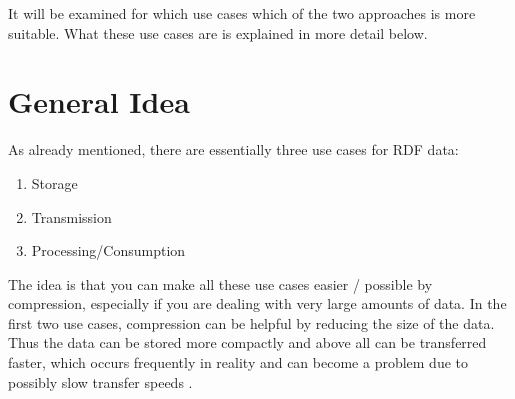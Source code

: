 It will be examined for which use cases which of the two approaches is more suitable. What these use cases are is explained in more detail below.



\section{General Idea}

%
%
%

As already mentioned, there are essentially three use cases for RDF data:

\begin{enumerate}
	\item Storage
	\item Transmission
	\item Processing/Consumption
\end{enumerate}

The idea is that you can make all these use cases easier / possible by compression, especially if you are dealing with very large amounts of data. In the first two use cases, compression can be helpful by reducing the size of the data. Thus the data can be stored more compactly and above all can be transferred faster, which occurs frequently in reality and can become a problem due to possibly slow transfer speeds .

